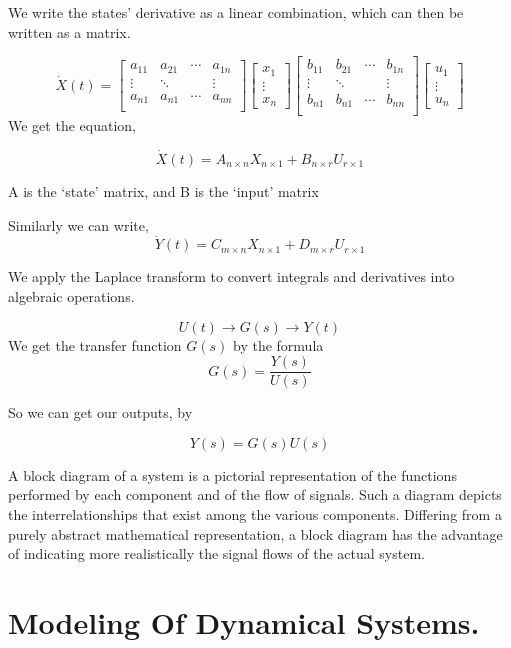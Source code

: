 \documentclass[11pt]{report}
\begin{document}
We write the states' derivative as a linear combination, which can then be written as a matrix.

$$ \dot{X}(t) = \begin{bmatrix} a_{11} & a_{21} & \cdots & a_{1n} \\ \vdots & \ddots & & \vdots \\ a_{n1} & a_{n1} & \cdots & a_{nn} \\ \end{bmatrix} \begin{bmatrix} x_1 \\ \vdots \\ x_n \end{bmatrix} \begin{bmatrix} b_{11} & b_{21} & \cdots & b_{1n} \\ \vdots & \ddots & & \vdots \\ b_{n1} & b_{n1} & \cdots & b_{nn} \\ \end{bmatrix} \begin{bmatrix} u_1 \\ \vdots \\ u_n \end{bmatrix}$$
We get the equation,

$$\dot{X}(t) = A_{n \times n} X_{n \times 1} + B_{n \times r} U_{r \times 1}$$

A is the `state' matrix, and B is the `input' matrix

Similarly we can write,
$$\dot{Y}(t) = C_{m \times n}X_{n \times 1} + D_{m \times r}U_{r \times 1}$$

We apply the Laplace transform to convert integrals and derivatives into algebraic operations.


$$U(t) \rightarrow G(s) \rightarrow Y(t)$$
We get the transfer function \(G(s)\) by the formula
$$G(s) = \frac{Y(s)}{U(s)}$$

So we can get our outputs, by

$$Y(s) = G(s)U(s)$$
\begin{definition}
A block diagram of a system is a pictorial representation of the functions performed by each component and of the flow of signals. Such a diagram depicts the interrelationships that exist among the various components. Differing from a purely abstract mathematical representation, a block diagram has the advantage of indicating more realistically the signal flows of the actual system.
\end{definition}
\section{Modeling Of Dynamical Systems.}
\label{sec:org4e0a2de}
\end{document}
